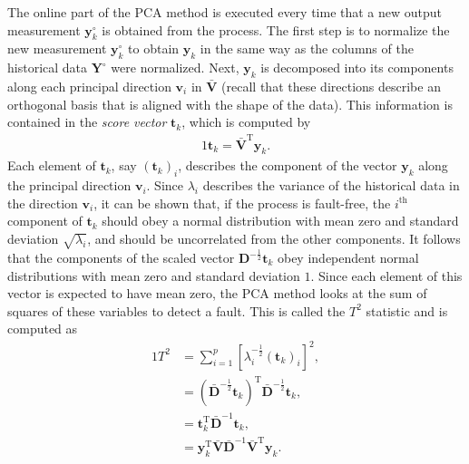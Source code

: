 \documentclass[14pt]{article}
\theoremstyle{definition}
\newcommand{\0}{\ensuremath{\mathbf{0}}}
\newcommand{\bs}[1]{\ensuremath{\mathbf{#1}}}
\begin{document}
The online part of the PCA method is executed every time that a new output measurement $\bs{y}_k^{\circ}$ is obtained from the process. The first step is to normalize the new measurement $\bs{y}^{\circ}_k$ to obtain $\bs{y}_k$ in the same way as the columns of the historical data $\bs{Y}^{\circ}$ were normalized. Next, $\bs{y}_k$ is decomposed into its components along each principal direction $\bs{v}_i$ in $\bar{\bs{V}}$ (recall that these directions describe an orthogonal basis that is aligned with the shape of the data). This information is contained in the \emph{score vector} $\bs{t}_k$, which is computed by
\begin{alignat}{1}
\bs{t}_k = \bar{\bs{V}}^{\mathrm{T}}\bs{y}_k.
\end{alignat}
Each element of $\bs{t}_k$, say $(\bs{t}_k)_i$, describes the component of the vector $\bs{y}_k$ along the principal direction $\bs{v}_i$. Since $\lambda_i$ describes the variance of the historical data in the direction $\bs{v}_i$, it can be shown that, if the process is fault-free, the $i^{\mathrm{th}}$ component of $\bs{t}_k$ should obey a normal distribution with mean zero and standard deviation $\sqrt{\lambda_i}$, and should be uncorrelated from the other components. It follows that the components of the scaled vector $\bs{D}^{-\frac{1}{2}}\bs{t}_k$ obey independent normal distributions with mean zero and standard deviation $1$. Since each element of this vector is expected to have mean zero, the PCA method looks at the sum of squares of these variables to detect a fault. This is called the $T^2$ statistic and is computed as
\begin{alignat}{1}
T^2 &= \sum_{i=1}^p \left[\lambda_i^{-\frac{1}{2}} (\bs{t}_k)_i\right]^2, \\
&= (\bar{\bs D}^{-\frac{1}{2}}\bs{t}_k)^{\mathrm{T}}\bar{\bs D}^{-\frac{1}{2}}\bs{t}_k, \\
&= \bs{t}_k^{\mathrm{T}}\bar{\bs D}^{-1}\bs{t}_k, \\
&= \bs{y}_k^{\mathrm{T}}\bar{\bs{V}}\bar{\bs D}^{-1}\bar{\bs{V}}^{\mathrm{T}}\bs{y}_k.
\end{alignat}
\end{document}
